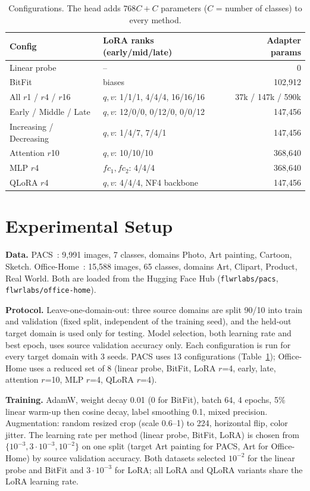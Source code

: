 \documentclass[10pt,twocolumn]{article}
\begin{document}
\begin{table}[t]
\centering\small
\begin{tabular}{llr}
\toprule
Config & LoRA ranks (early/mid/late) & Adapter params \\
\midrule
Linear probe & -- & 0 \\
BitFit & biases & 102{,}912 \\
All $r$1 / $r$4 / $r$16 & $q,v$: 1/1/1, 4/4/4, 16/16/16 & 37k / 147k / 590k \\
Early / Middle / Late & $q,v$: 12/0/0, 0/12/0, 0/0/12 & 147{,}456 \\
Increasing / Decreasing & $q,v$: 1/4/7, 7/4/1 & 147{,}456 \\
Attention $r$10 & $q,v$: 10/10/10 & 368{,}640 \\
MLP $r$4 & $fc_1,fc_2$: 4/4/4 & 368{,}640 \\
QLoRA $r$4 & $q,v$: 4/4/4, NF4 backbone & 147{,}456 \\
\bottomrule
\end{tabular}
\caption{Configurations. The head adds $768C{+}C$ parameters ($C$ = number of classes) to every method.}
\label{tab:configs}
\end{table}

\section{Experimental Setup}
\textbf{Data.} PACS~\cite{li2017pacs}: 9{,}991 images, 7 classes, domains Photo, Art painting, Cartoon, Sketch.
Office-Home~\cite{venkateswara2017officehome}: 15{,}588 images, 65 classes, domains Art, Clipart, Product, Real
World. Both are loaded from the Hugging Face Hub (\texttt{flwrlabs/pacs}, \texttt{flwrlabs/office-home}).

\textbf{Protocol.} Leave-one-domain-out: three source domains are split 90/10 into train and validation (fixed split,
independent of the training seed), and the held-out target domain is used only for testing. Model selection,
both learning rate and best epoch, uses source validation accuracy only. Each configuration is run for every
target domain with 3 seeds. PACS uses 13 configurations (Table~\ref{tab:configs}); Office-Home uses a reduced set of 8 (linear probe, BitFit, LoRA $r$=4, early, late, attention $r$=10, MLP $r$=4, QLoRA $r$=4).

\textbf{Training.} AdamW, weight decay 0.01 (0 for BitFit), batch 64, 4 epochs, 5\% linear warm-up then cosine
decay, label smoothing 0.1, mixed precision. Augmentation: random resized crop (scale 0.6--1) to 224, horizontal
flip, color jitter. The learning rate per method (linear probe, BitFit, LoRA) is chosen from
$\{10^{-3}, 3{\cdot}10^{-3}, 10^{-2}\}$ on one split (target Art painting for PACS, Art for Office-Home) by source validation accuracy. Both datasets selected $10^{-2}$ for the linear probe and BitFit and $3{\cdot}10^{-3}$ for LoRA; all LoRA and QLoRA variants share the LoRA learning rate.
\end{document}
